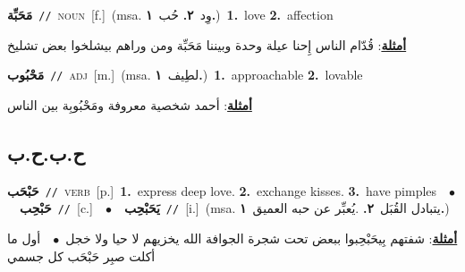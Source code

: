 \documentclass[10pt,a4paper,twoside]{article} %
\begin{document}
\begin{multicols}{2}
{\setlength\topsep{0pt}\textbf{\foreignlanguage{arabic}{مَحَبِّة}}\ {\color{gray}\texttt{//}\color{black}}\ \textsc{noun}\ [f.]\ \color{gray}(msa. \foreignlanguage{arabic}{وِد}~\foreignlanguage{arabic}{\textbf{٢.}}  \foreignlanguage{arabic}{حُب}~\foreignlanguage{arabic}{\textbf{١.}})\color{black}\ \textbf{1.}~love  \textbf{2.}~affection\  \begin{flushright}\color{gray}\foreignlanguage{arabic}{\textbf{\underline{\foreignlanguage{arabic}{أمثلة}}}: قُدّام الناس إِحنا عيلة وحدة وبيننا مَحَبِّة ومن وراهم بيشلخوا بعض تشليخ}\end{flushright}\color{black}} \vspace{2mm}

{\setlength\topsep{0pt}\textbf{\foreignlanguage{arabic}{مَحْبُوب}}\ {\color{gray}\texttt{//}\color{black}}\ \textsc{adj}\ [m.]\ \color{gray}(msa. \foreignlanguage{arabic}{لطِيف}~\foreignlanguage{arabic}{\textbf{١.}})\color{black}\ \textbf{1.}~approachable  \textbf{2.}~lovable\  \begin{flushright}\color{gray}\foreignlanguage{arabic}{\textbf{\underline{\foreignlanguage{arabic}{أمثلة}}}: أحمد شخصية معروفة ومَحْبُوبِة بين الناس}\end{flushright}\color{black}} \vspace{2mm}

\vspace{-3mm}
\subsection*{\color{blue}\foreignlanguage{arabic}{ح.ب.ح.ب}\color{blue}{}} 

{\setlength\topsep{0pt}\textbf{\foreignlanguage{arabic}{حَبْحَب}}\ {\color{gray}\texttt{//}\color{black}}\ \textsc{verb}\ [p.]\ \textbf{1.}~express deep love.  \textbf{2.}~exchange kisses.  \textbf{3.}~have pimples\ \ $\bullet$\ \ \setlength\topsep{0pt}\textbf{\foreignlanguage{arabic}{حَبْحِب}}\ {\color{gray}\texttt{//}\color{black}}\ [c.]\ \ $\bullet$\ \ \setlength\topsep{0pt}\textbf{\foreignlanguage{arabic}{يَحَبْحِب}}\ {\color{gray}\texttt{//}\color{black}}\ [i.]\ \color{gray}(msa. \foreignlanguage{arabic}{يتبادل القُبَل}~\foreignlanguage{arabic}{\textbf{٢.}}  .\foreignlanguage{arabic}{يُعبِّر عن حبه العميق}~\foreignlanguage{arabic}{\textbf{١.}})\color{black}\  \begin{flushright}\color{gray}\foreignlanguage{arabic}{\textbf{\underline{\foreignlanguage{arabic}{أمثلة}}}: شفتهم بِيحَبْحِبوا ببعض تحت شجرة الجوافة الله يخزيهم لا حيا ولا خجل\ $\bullet$\ \  أول ما أكلت صبِر حَبْحَب  كل جسمي}\end{flushright}\color{black}} \vspace{2mm}


\end{multicols}
\end{document}
